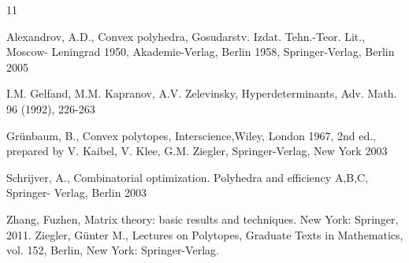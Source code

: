 \documentclass[a4paper, 12pt]{amsart}
\theoremstyle{plain}
\begin{document}
\begin{thebibliography}{11} \rm
   
 Alexandrov, A.D., Convex polyhedra, Gosudarstv. Izdat. Tehn.-Teor. Lit., Moscow-
Leningrad 1950, Akademie-Verlag, Berlin 1958, Springer-Verlag, Berlin 2005



 I.M. Gelfand, M.M. Kapranov, A.V. Zelevinsky, Hyperdeterminants, Adv.
Math. 96 (1992), 226-263 

Grünbaum, B., Convex polytopes, Interscience,Wiley, London 1967, 2nd ed., prepared
by V. Kaibel, V. Klee, G.M. Ziegler, Springer-Verlag, New York 2003

 Schrijver, A., Combinatorial optimization. Polyhedra and efficiency A,B,C, Springer-
Verlag, Berlin 2003

 Zhang, Fuzhen, Matrix theory: basic results and techniques. New York: Springer, 2011.
 Ziegler, Günter M., Lectures on Polytopes, Graduate Texts in Mathematics, vol. 152, Berlin, New York: Springer-Verlag.

\end{thebibliography}
\end{document}
